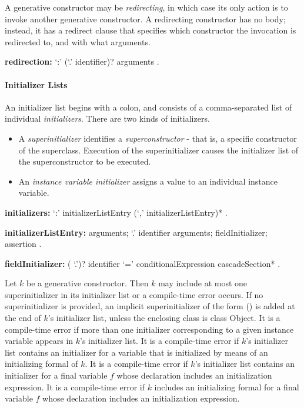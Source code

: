 \documentclass{article}
\newcommand{\code}[1]{{\sf #1}}
\begin{document}
\LMHash{}
A generative constructor may be {\em redirecting}, in which case its only action is to invoke another generative constructor.  A redirecting constructor has no body; instead, it has a redirect clause that specifies which constructor the invocation is redirected to, and with what arguments.

\begin{grammar}
{\bf redirection:}
     `{\escapegrammar :}' \THIS{} (`{\escapegrammar .}' identifier)? arguments
    .
\end{grammar}


\paragraph{Initializer Lists}

\LMHash{}
An initializer list begins with a colon, and consists of a comma-separated list of individual {\em initializers}. There are two kinds of initializers.
\begin{itemize}
\item A {\em superinitializer} identifies a {\em superconstructor} - that is, a specific constructor of the superclass.  Execution of the superinitializer causes the initializer list of the superconstructor to be executed.

\item An {\em instance variable initializer} assigns a value to an individual instance variable.
\end{itemize}

\begin{grammar}
{\bf initializers:}
      `{\escapegrammar :}' initializerListEntry (`,' initializerListEntry)*
    .


{\bf initializerListEntry:}\SUPER{} arguments;
      \SUPER{} `{\escapegrammar .}' identifier arguments;
     fieldInitializer;
     assertion
    .

   {\bf  fieldInitializer:}
      (\THIS{} `{\escapegrammar .}')? identifier `=' conditionalExpression cascadeSection*
    .

\end{grammar}

\LMHash{}
Let $k$ be a generative constructor.
Then $k$ may include at most one superinitializer in its initializer list or a compile-time error occurs.
If no superinitializer is provided, an implicit superinitializer of the form \SUPER{}() is added at the end of $k$'s initializer list,
unless the enclosing class is class \code{Object}.
It is a compile-time error if more than one initializer corresponding to a given instance variable appears in $k$'s initializer list.
It is a compile-time error if $k$'s initializer list contains an initializer for a variable that is initialized by means of an initializing formal of $k$.
It is a compile-time error if $k$'s initializer list contains an initializer for a final variable $f$ whose declaration includes an initialization expression.
It is a compile-time error if $k$ includes an initializing formal for a final variable $f$ whose declaration includes an initialization expression.
\end{document}
